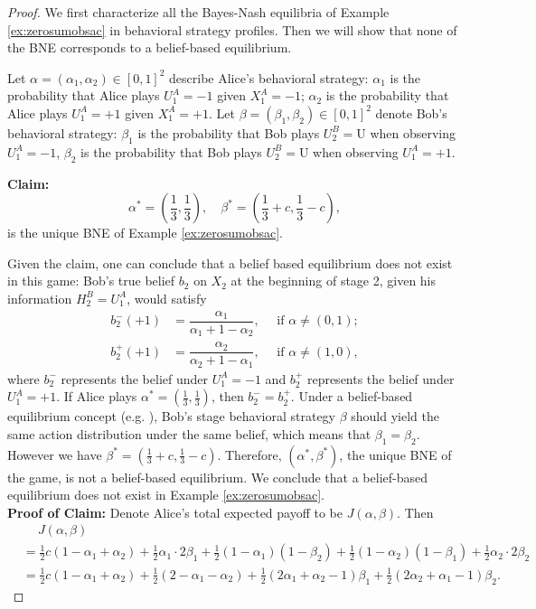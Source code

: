 \documentclass[pdflatex,sn-basic]{sn-jnl}
\newcommand{\es}{\enspace\enspace\:}
\theoremstyle{thmstyleone}%
\theoremstyle{thmstyletwo}%
\theoremstyle{thmstylethree}%
\begin{document}
\begin{appendices}
\begin{proof}
    We first characterize all the Bayes-Nash equilibria of Example \ref{ex:zerosumobsac} in behavioral strategy profiles. Then we will show that none of the BNE corresponds to a belief-based equilibrium. 
	
	Let $\alpha=(\alpha_1, \alpha_2)\in [0, 1]^2$ describe Alice's behavioral strategy: $\alpha_1$ is the probability that Alice plays $U_1^A=-1$ given $X_1^A=-1$; $\alpha_2$ is the probability that Alice plays $U_1^A=+1$ given $X_1^A=+1$. Let $\beta=(\beta_1, \beta_2)\in [0, 1]^2$ denote Bob's behavioral strategy: $\beta_1$ is the probability that Bob plays $U_2^B=\mathrm{U}$ when observing $U_1^A=-1$, $\beta_2$ is the probability that Bob plays $U_2^B=\mathrm{U}$ when observing $U_1^A=+1$.
	
	\textbf{Claim:}
	\begin{equation}
		\alpha^*=\left(\frac{1}{3}, \frac{1}{3}\right),\quad \beta^*=\left(\frac{1}{3}+c, \frac{1}{3}-c\right),
	\end{equation}
	is the unique BNE of Example \ref{ex:zerosumobsac}.
	
	Given the claim, one can conclude that a belief based equilibrium does not exist in this game: {Bob's true belief $b_2$ on $X_2$ at the beginning of stage 2, given his information $H_2^B = U_1^A$, would satisfy}
    \begin{align}
		b_2^-(+1) &= \dfrac{\alpha_1}{\alpha_1+1-\alpha_2},\quad\text{ if }\alpha\neq (0, 1);\\
		b_2^+(+1) &= \dfrac{\alpha_2}{\alpha_2+1-\alpha_1},\quad\text{ if }\alpha\neq (1, 0),
	\end{align}
    {where $b_2^{-}$ represents the belief under $U_1^A = -1$ and $b_2^{+}$ represents the belief under $U_1^A = +1$. If Alice plays $\alpha^*=\left(\frac{1}{3}, \frac{1}{3}\right)$, then $b_2^- = b_2^+$. Under a belief-based equilibrium concept (e.g. \cite{ouyang2016dynamic,vasal2019spbe}), Bob's stage behavioral strategy $\beta$ should yield the same action distribution under the same belief, which means that $\beta_1=\beta_2$. However we have $\beta^*=\left(\frac{1}{3}+c, \frac{1}{3}-c\right)$. Therefore, $(\alpha^*, \beta^*)$, the unique BNE of the game, is not a belief-based equilibrium. We conclude that a belief-based equilibrium does not exist in Example \ref{ex:zerosumobsac}.}\\  
	
	\textbf{Proof of Claim:}
	Denote Alice's total expected payoff to be $J(\alpha, \beta)$. Then 
	\begin{align*}
		&\es J(\alpha, \beta) \\
		&= \frac{1}{2}c(1-\alpha_1+\alpha_2) + \frac{1}{2} \alpha_1 \cdot 2\beta_1 + \frac{1}{2} (1-\alpha_1)(1-\beta_2) +\frac{1}{2} (1-\alpha_2)(1-\beta_1) + \frac{1}{2} \alpha_2\cdot 2\beta_2 \\
		&=\frac{1}{2}c(1-\alpha_1+\alpha_2) + \frac{1}{2} (2 - \alpha_1 - \alpha_2) + \frac{1}{2}(2\alpha_1 + \alpha_2 - 1)\beta_1 + \frac{1}{2}(2\alpha_2 + \alpha_1 - 1)\beta_2.
	\end{align*}
	

\end{proof}
\end{appendices}
\end{document}
